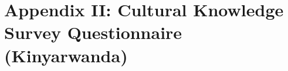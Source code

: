 \documentclass{CSSRforAfrica}
\newcommand{\Qq}[1]{{#1}} %
\newcommand{\QO}{$\Box$}%
\newcommand{\Qline}[1]{\noindent\rule{#1}{0.6pt}}
\newenvironment{Qlist}{%
\renewcommand{\labelitemi}{\QO}
\begin{itemize}[leftmargin=1.5em,topsep=0em]}{
\end{itemize}
}
\newcounter{itemnummer}
\newcommand{\Qitem}[2][]{%
\ifthenelse{\equal{#1}{}}{\stepcounter{itemnummer}}{}
\ifthenelse{\equal{#1}{a}}{\stepcounter{itemnummer}}{}
\begin{enumerate}[topsep=2pt,leftmargin=1.7em]  %
\item[{\arabic{itemnummer}#1.}] #2
\end{enumerate}
}
\begin{document}

\newpage
\section*{Appendix II: Cultural Knowledge  Survey  Questionnaire  (Kinyarwanda)}
\end{document}
